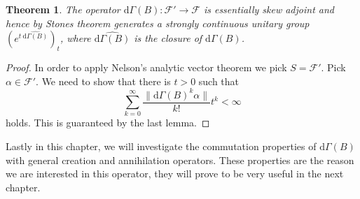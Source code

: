 \documentclass[b5paper,draft,openbib,12pt]{memoir}
\newtheorem{Thm}[Def]{Theorem}
\begin{document}
\begin{Thm}\label{Gamma essential selfadjointness}
The operator \(\mathrm{d}\Gamma(B):\mathcal{F}'\rightarrow \mathcal{F}\) is 
essentially skew adjoint and hence by Stones theorem
 generates a strongly continuous unitary group 
 \(\left( e^{t ~\widehat{\mathrm{d}\Gamma(B)}}\right)_t\), where 
 \(\widehat{\mathrm{d}\Gamma(B)}\) is the closure of 
 \(\mathrm{d}\Gamma(B)\).
\end{Thm}
\begin{proof}
In order to apply Nelson's analytic vector theorem we pick \(S=\mathcal{F}'\). 
Pick \(\alpha \in\mathcal{F}'\). We need to show that there is \(t>0\) such 
that
\begin{equation}
\sum_{k=0}^\infty \frac{\|\mathrm{d}\Gamma(B)^k \alpha\|}{k!} t^k <\infty
\end{equation}
holds. This is guaranteed by the last lemma.
\end{proof}

Lastly in this chapter, we will investigate the commutation properties of \(\mathrm{d}\Gamma(B)\) with general creation and annihilation operators.
These properties are the reason we are interested in this operator, they will prove to be very useful in the next chapter.
\end{document}
